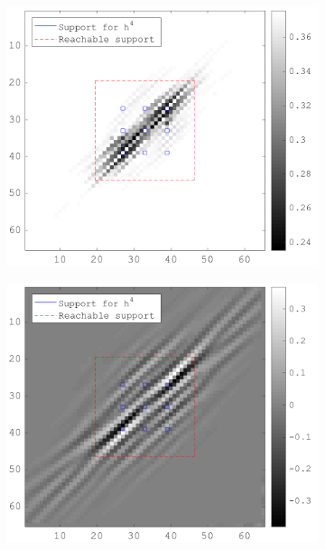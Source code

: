 \begin{figure}[!h]
\begin{subfigure}[b]{0.49\textwidth}
\end{subfigure}
   \begin{subfigure}[b]{0.49\textwidth}\centering
    \includegraphics[width=\textwidth]{figures/xp/xp_128x128_sc2_angl1_K3_S3_node4_obj_matrix.png}
    \end{subfigure}
       \begin{subfigure}[b]{0.49\textwidth}\centering
    \includegraphics[width=\textwidth]{figures/xp/xp_128x128_sc2_angl1_K3_S3_node4_gradient_node_4.png}
    \end{subfigure}
\end{figure}


